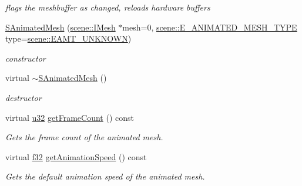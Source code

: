 \begin{DoxyCompactItemize}
\begin{DoxyCompactList}\small\item\em flags the meshbuffer as changed, reloads hardware buffers \end{DoxyCompactList}\item 
\mbox{\label{structirr_1_1scene_1_1SAnimatedMesh_a9f02f671b75c1009b35bf7d49f277c8d}} 
\hyperlink{structirr_1_1scene_1_1SAnimatedMesh_a9f02f671b75c1009b35bf7d49f277c8d}{S\+Animated\+Mesh} (\hyperlink{classirr_1_1scene_1_1IMesh}{scene\+::\+I\+Mesh} $\ast$mesh=0, \hyperlink{namespaceirr_1_1scene_a2fc85a64604521ca063f1881b5dd1c61}{scene\+::\+E\+\_\+\+A\+N\+I\+M\+A\+T\+E\+D\+\_\+\+M\+E\+S\+H\+\_\+\+T\+Y\+PE} type=\hyperlink{namespaceirr_1_1scene_a2fc85a64604521ca063f1881b5dd1c61a2db2999504900cad42b9295f4198434f}{scene\+::\+E\+A\+M\+T\+\_\+\+U\+N\+K\+N\+O\+WN})
\begin{DoxyCompactList}\small\item\em constructor \end{DoxyCompactList}\item 
\mbox{\label{structirr_1_1scene_1_1SAnimatedMesh_a59d891b250eb3803b1af81adba447593}} 
virtual \hyperlink{structirr_1_1scene_1_1SAnimatedMesh_a59d891b250eb3803b1af81adba447593}{$\sim$\+S\+Animated\+Mesh} ()
\begin{DoxyCompactList}\small\item\em destructor \end{DoxyCompactList}\item 
virtual \hyperlink{namespaceirr_a0416a53257075833e7002efd0a18e804}{u32} \hyperlink{structirr_1_1scene_1_1SAnimatedMesh_a58d8940d3002792194c74e209a5f2949}{get\+Frame\+Count} () const
\begin{DoxyCompactList}\small\item\em Gets the frame count of the animated mesh. \end{DoxyCompactList}\item 
virtual \hyperlink{namespaceirr_a0277be98d67dc26ff93b1a6a1d086b07}{f32} \hyperlink{structirr_1_1scene_1_1SAnimatedMesh_aa6b6302dad72761e22ba10cc4486b4c8}{get\+Animation\+Speed} () const
\begin{DoxyCompactList}\small\item\em Gets the default animation speed of the animated mesh. \end{DoxyCompactList}\item 

\end{DoxyCompactItemize}
